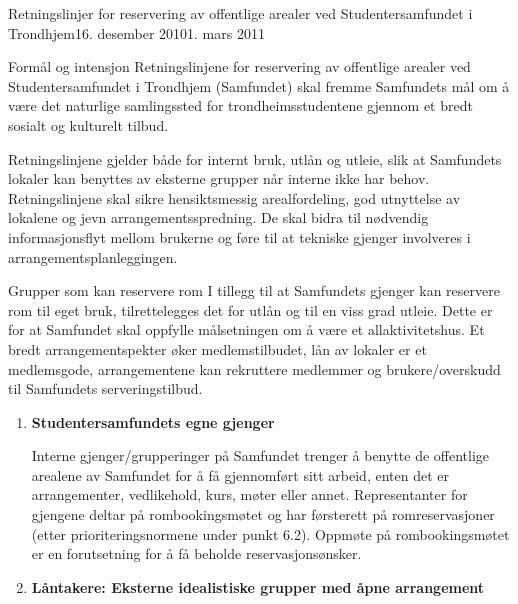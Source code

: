 
\begin{instruks}{Retningslinjer for reservering av offentlige arealer
    ved Studentersamfundet i Trondhjem}{16. desember 2010}{1. mars 2011}

    \begin{instruksledd}{Formål og intensjon}
        Retningslinjene for reservering av offentlige arealer ved Studentersamfundet i Trondhjem
        (Samfundet) skal fremme
        Samfundets mål om å være det naturlige samlingssted for trondheimsstudentene gjennom et
        bredt sosialt og kulturelt tilbud.


        Retningslinjene gjelder både for internt bruk, utlån og utleie, slik at Samfundets lokaler
        kan benyttes av eksterne
        grupper når interne ikke har behov. Retningslinjene skal sikre hensiktsmessig
        arealfordeling, god utnyttelse av
        lokalene og jevn arrangementsspredning. De skal bidra til nødvendig informasjonsflyt
        mellom brukerne og føre til at
        tekniske gjenger involveres i arrangementsplanleggingen.
    \end{instruksledd}

    \begin{instruksledd}{Grupper som kan reservere rom}
        I tillegg til at Samfundets gjenger kan reservere rom til eget bruk,
        tilrettelegges det for utlån og til en viss grad utleie.
        Dette er for at Samfundet skal oppfylle målsetningen om å være et
        allaktivitetshus. Et bredt arrangementspekter øker
        medlemstilbudet, lån av lokaler er et medlemsgode, arrangementene kan rekruttere
        medlemmer og brukere/overskudd
        til Samfundets serveringstilbud.

        \begin{enumerate}
            \item \textbf{Studentersamfundets egne gjenger}

                Interne gjenger/grupperinger på Samfundet trenger å benytte de offentlige
                arealene av
                Samfundet for å få gjennomført sitt arbeid, enten det er arrangementer,
                vedlikehold, kurs,
                møter eller annet. Representanter for gjengene deltar på rombookingsmøtet
                og har førsterett
                på romreservasjoner (etter prioriteringsnormene under punkt 6.2). Oppmøte
                på
                rombookingsmøtet er en forutsetning for å få beholde reservasjonsønsker.

            \item \textbf{ Låntakere: Eksterne idealistiske grupper med åpne arrangement}


\end{enumerate}
\end{instruksledd}
\end{instruks}
